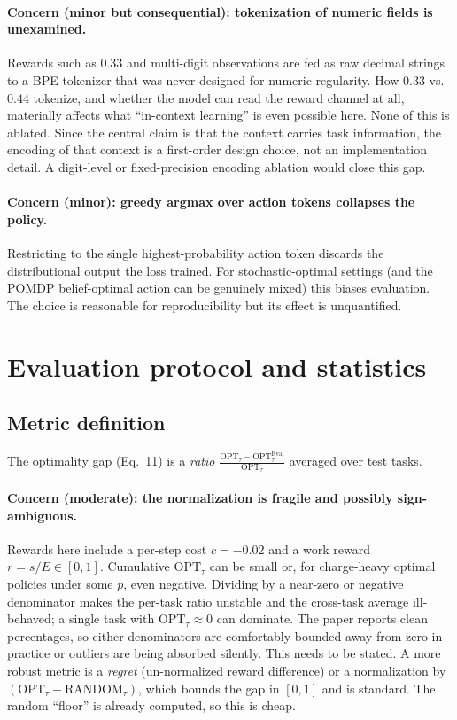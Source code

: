 \documentclass[11pt]{article}
\begin{document}
\paragraph{Concern (minor but consequential): tokenization of numeric fields is unexamined.}
Rewards such as $0.33$ and multi-digit observations are fed as raw decimal strings to a
BPE tokenizer that was never designed for numeric regularity. How $0.33$ vs.\ $0.44$ tokenize,
and whether the model can read the reward channel at all, materially affects what ``in-context
learning'' is even possible here. None of this is ablated. Since the central claim is that the
context carries task information, the encoding of that context is a first-order design choice,
not an implementation detail. A digit-level or fixed-precision encoding ablation would close
this gap.

\paragraph{Concern (minor): greedy argmax over action tokens collapses the policy.} Restricting
to the single highest-probability action token discards the distributional output the loss
trained. For stochastic-optimal settings (and the POMDP belief-optimal action can be
genuinely mixed) this biases evaluation. The choice is reasonable for reproducibility but its
effect is unquantified.

\section{Evaluation protocol and statistics}

\subsection{Metric definition}

The optimality gap (Eq.\ 11) is a \emph{ratio} $\frac{\mathrm{OPT}_\tau - \mathrm{OPT}^{\mathrm{Eval}}_\tau}{\mathrm{OPT}_\tau}$ averaged over test tasks.

\paragraph{Concern (moderate): the normalization is fragile and possibly sign-ambiguous.}
Rewards here include a per-step cost $c=-0.02$ and a work reward $r=s/E\in[0,1]$. Cumulative
$\mathrm{OPT}_\tau$ can be small or, for charge-heavy optimal policies under some $p$, even
negative. Dividing by a near-zero or negative denominator makes the per-task ratio unstable
and the cross-task average ill-behaved; a single task with $\mathrm{OPT}_\tau\approx 0$ can
dominate. The paper reports clean percentages, so either denominators are comfortably bounded
away from zero in practice or outliers are being absorbed silently. This needs to be stated.
A more robust metric is a \emph{regret} (un-normalized reward difference) or a normalization
by $(\mathrm{OPT}_\tau - \mathrm{RANDOM}_\tau)$, which bounds the gap in $[0,1]$ and is
standard. The random ``floor'' is already computed, so this is cheap.
\end{document}
